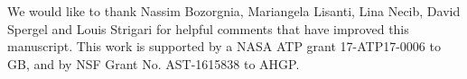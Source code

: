 \documentclass[letterpaper,11pt]{article}
\begin{document}
\acknowledgments

We would like to thank Nassim Bozorgnia, Mariangela Lisanti, 
Lina Necib, David Spergel and Louis Strigari for helpful comments 
that have improved this manuscript.
This work is supported by a NASA ATP grant 17-ATP17-0006 to GB, and by NSF Grant No. AST-1615838 to AHGP.



{}
\end{document}
